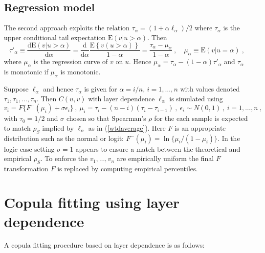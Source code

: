\documentclass[authoryear]{elsarticle}
\newcommand{\eps}{\epsilon}
\newcommand{\E}{{\mathrm E}}
\newcommand{\de}{\mathrm{d}}
\newcommand{\cq}{\ ,\quad }
\newcommand{\eref}[1]{(\ref{#1})}
\begin{document}
\subsection{Regression model}

The second approach exploits the relation $\tau_\alpha=(1+\alpha\ell_\alpha)/2$ where $\tau_\alpha$ is the upper conditional tail expectation $\E(v|u>\alpha)$.  Then
$$
\tau'_\alpha \equiv\frac{\de\E(v|u>\alpha)}{\de\alpha}= \frac{\de}{\de \alpha} \frac{\E\left\{v(u>\alpha)\right\}}{1-\alpha}
= \frac{\tau_\alpha-\mu_\alpha}{1-\alpha}\cq \mu_\alpha\equiv \E(v|u=\alpha)\;,
$$
where $\mu_\alpha$ is the regression curve of $v$ on $u$. Hence $\mu_\alpha=\tau_\alpha-(1-\alpha)\tau'_\alpha$
and $\tau_\alpha$ is monotonic if $\mu_\alpha$ is monotonic.

Suppose $\ell_\alpha$ and hence $\tau_\alpha$ is given for $\alpha=i/n$, $i=1,\ldots,n$ with values denoted $\tau_1,\tau_1,\ldots,\tau_{n}$.   Then  $C(u,v)$ with layer dependence $\ell_\alpha$ is simulated using
$$
v_i=F\{F^-(\mu_i)+\sigma\eps_i\}\ ,\ \mu_{i}=\tau_i - (n-i)(\tau_{i}-\tau_{i-1})\ ,\ \eps_i\sim N(0,1)\ ,\  i=1,\ldots,n\ ,
$$
with $\tau_0=1/2$ and $\sigma$ chosen so that Spearman's $\rho$ for the each sample is expected to match $\rho_S$ implied by $\ell_\alpha$ as in \eref{wtdaverage}.  Here $F$ is an appropriate distribution such as the normal or  logit:  $F^-(\mu_i)=\ln\{\mu_i/(1-\mu_i)\}$.  In the logic case setting $\sigma=1$ appears to ensure a match between the theoretical and empirical $\rho_S$.  To enforce the $v_1,\ldots,v_n$ are empirically uniform the final $F$ transformation $F$ is replaced by computing  empirical percentiles.



\section{Copula fitting using layer dependence}\label{sfitting}

A copula fitting procedure based on layer dependence is as follows:
\end{document}
